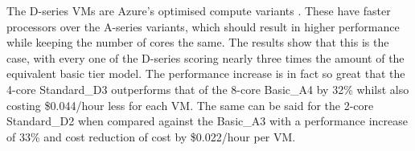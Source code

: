 \documentclass{llncs}
\begin{document}
\begin{table*}[!h]
\begin{adjustbox}{width=\linewidth,center}
  \end{adjustbox}
\end{table*}
%

The D-series VMs are Azure's optimised compute variants \cite{azurevmtype}. These have faster processors over the A-series variants, which should result in higher performance while keeping the number of cores the same. The results show that this is the case, with every one of the D-series scoring nearly three times the amount of the equivalent basic tier model. The performance increase is in fact so great that the 4-core Standard\_D3 outperforms that of the 8-core Basic\_A4 by 32\% whilst also costing \$0.044/hour less for each VM. The same can be said for the 2-core Standard\_D2 when compared against the Basic\_A3 with a performance increase of 33\% and cost reduction of cost by \$0.022/hour per VM.
\end{document}
